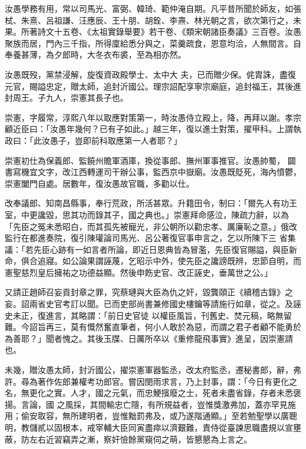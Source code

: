 \begin{pinyinscope}
 汝愚學務有用，常以司馬光、富弼、韓琦、範仲淹自期。凡平昔所聞於師友，如張栻、朱熹、呂祖謙、汪應辰、王十朋、胡銓、李燾、林光朝之言，欲次第行之，未果。所著詩文十五卷、《太祖實錄舉要》若干卷、《類宋朝諸臣奏議》三百卷。汝愚聚族而居，門內三千指，所得廩給悉分與之，菜羹疏食，恩意均洽，人無間言。自奉養甚薄，為夕郎時，大冬衣布裘，至為相亦然。



 汝愚既歿，黨禁浸解，旋復資政殿學士、太中大
 夫，已而贈少保。侂胄誅，盡復元官，賜謚忠定，贈太師，追封沂國公。理宗詔配享寧宗廟庭，追封福王，其後進封周王。子九人，崇憲其長子也。



 崇憲，字履常，淳熙八年以取應對策第一，時汝愚侍立殿上，降，再拜以謝。孝宗顧近臣曰：「汝愚年幾何？已有子如此。」越三年，復以進士對策，擢甲科。上謂執政曰：「此汝愚子，豈即前科取應第一人者耶？」



 崇憲初仕為保義郎、監饒州贍軍酒庫，換從事郎、撫州軍事推官。汝愚帥蜀，
 闢書寫機宜文字，改江西轉運司干辦公事，監西京中嶽廟。汝愚既貶死，海內憤鬱，崇憲闔門自處。居數年，復汝愚故官職，多勸以仕。



 改奉議郎、知南昌縣事，奉行荒政，所活甚眾。升籍田令，制曰：「爾先人有功王室，中更讒毀，思其功而錄其子，國之典也。」崇憲拜命感泣，陳疏力辭，以為「先臣之冤未悉昭白，而其孤先被寵光，非公朝所以勸忠孝、厲廉恥之意。」俄改監行在都進奏院，復引陳瓘論司馬光、呂公著復官事申言之，乞以所陳下三
 省集議：「若先臣心跡有一如言者所論，即近日恩典皆為冒濫，先臣復官賜謚，與臣新命，俱合追寢。如公論果謂誣蔑，乞昭示中外，使先臣之讒謗既辨，忠節自明，而憲聖慈烈皇后擁祐之功德益顯。然後申飭史官、改正誣史，垂萬世之公。」



 又請正趙師召妄貢封章之罪，究蔡璉與大臣為仇之奸，毀龔頤正《續稽古錄》之妄。詔兩省史官考訂以聞。已而吏部尚書兼修國史樓鑰等請施行如章，從之。及誣史未正，復進言，其略謂：「前日史官徒
 以權臣風旨，刊舊史、焚元稿，略無留難。今詔旨再三，莫有慨然奮直筆者，何小人敢於為惡，而謂之君子者顧不能勇於為善耶？」聞者愧之。其後玉牒、日厲所卒以《重修龍飛事實》進呈，因崇憲請也。



 未幾，贈汝愚太師，封沂國公，擢崇憲軍器監丞，改太府監丞，遷秘書郎，辭，弗許。尋為著作佐郎兼權考功郎官。嘗因閔雨求言，乃上封事，謂：「今日有更化之名，無更化之實。人才，國之元氣，而忠鯁擯廢之士，死者未盡省錄，存者未悉褒揚。言論，國
 之風採，其間輸忠亡隱，有所規益者，豈惟獎激弗加，蓋亦罕見施用；偷安取容，無所建明者，豈惟黜罰弗及，或乃遂階通顯。」至若勉聖學以廣聰明，教儲貳以固根本，戒宰輔大臣同寅盡瘁以濟艱難，責侍從臺諫思職盡規以宣壅蔽，防左右近習竊弄之漸，察奸憸餘黨窺伺之萌，皆懇懇為上言之。




\end{pinyinscope}
